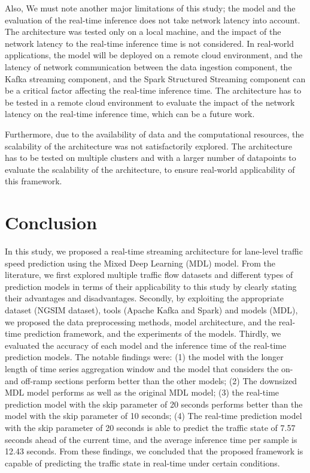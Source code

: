 \documentclass[11pt]{uonthesis}
\begin{document}
Also, We must note another major limitations of this study; the model and the evaluation of the real-time inference does not take network latency into account. The architecture was tested only on a local machine, and the impact of the network latency to the real-time inference time is not considered. In real-world applications, the model will be deployed on a remote cloud environment, and the latency of network communication between the data ingestion component, the Kafka streaming component, and the Spark Structured Streaming component can be a critical factor affecting the real-time inference time. The architecture has to be tested in a remote cloud environment to evaluate the impact of the network latency on the real-time inference time, which can be a future work.

Furthermore, due to the availability of data and the computational resources, the scalability of the architecture was not satisfactorily explored. The architecture has to be tested on multiple clusters and with a larger number of datapoints to evaluate the scalability of the architecture, to ensure real-world applicability of this framework.

\chapter{Conclusion}

In this study, we proposed a real-time streaming architecture for lane-level traffic speed prediction using the Mixed Deep Learning (MDL) model. From the literature, we first explored multiple traffic flow datasets and different types of prediction models in terms of their applicability to this study by clearly stating their advantages and disadvantages. Secondly, by exploiting the appropriate dataset (NGSIM dataset), tools (Apache Kafka and Spark) and models (MDL), we proposed the data preprocessing methods, model architecture, and the real-time prediction framework, and the experiments of the models. Thirdly, we evaluated the accuracy of each model and the inference time of the real-time prediction models. The notable findings were: (1) the model with the longer length of time series aggregation window and the model that considers the on- and off-ramp sections perform better than the other models; (2) The downsized MDL model performs as well as the original MDL model; (3) the real-time prediction model with the skip parameter of 20 seconds performs better than the model with the skip parameter of 10 seconds; (4) The real-time prediction model with the skip parameter of 20 seconds is able to predict the traffic state of 7.57 seconds ahead of the current time, and the average inference time per sample is 12.43 seconds. From these findings, we concluded that the proposed framework is capable of predicting the traffic state in real-time under certain conditions.
\end{document}
